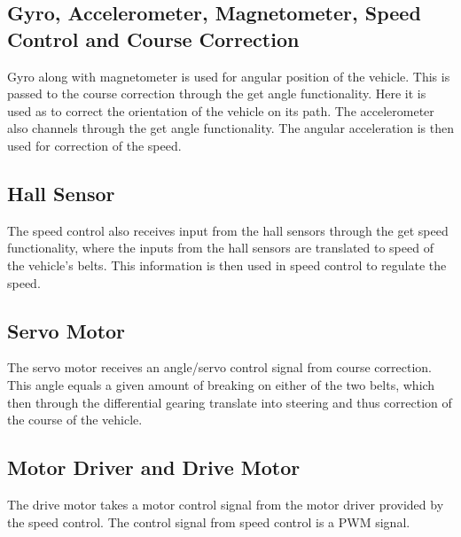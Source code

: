 \subsection{Gyro, Accelerometer, Magnetometer, Speed Control and Course Correction}
Gyro along with magnetometer is used for angular position of the vehicle. This is passed to the course correction through the get angle functionality. Here it is used as to correct the orientation of the vehicle on its path. The accelerometer also channels through the get angle functionality. The angular acceleration is then used for correction of the speed.

\subsection{Hall Sensor}
The speed control also receives input from the hall sensors through the get speed functionality, where the inputs from the hall sensors are translated to speed of the vehicle's belts. This information is then used in speed control to regulate the speed.

\subsection{Servo Motor}
The servo motor receives an angle/servo control signal from course correction. This angle equals a given amount of breaking on either of the two belts, which then through the differential gearing translate into steering and thus correction of the course of the vehicle.

\subsection{Motor Driver and Drive Motor}
The drive motor takes a motor control signal from the motor driver provided by the speed control. The control signal from speed control is a PWM signal.

